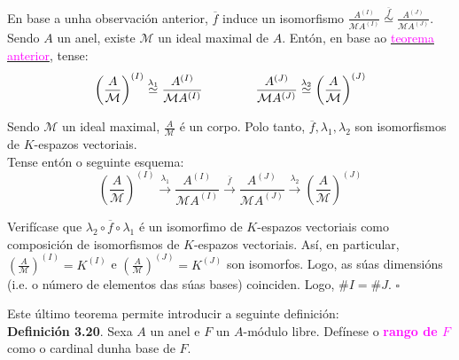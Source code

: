 \documentclass[twoside]{report}
\newcommand{\magbf}[1]{\textcolor{magenta}{\textbf{#1}}} %
\newcommand{\magen}[1]{\textcolor{magenta}{#1}}
\theoremstyle{mystyle}
\begin{document}
\vspace{2mm}

\noindent En base a unha observación anterior, $\overline{f}$ induce un isomorfismo $\displaystyle \frac{A^{(I)}}{\mathcal{M}A^{(I)}} \overset{\overline{f}}{\simeq} \displaystyle \frac{A^{(J)}}{\mathcal{M}A^{(J)}}$.\\
    
\noindent Sendo $A$ un anel, existe $\mathcal{M}$ un ideal maximal de $A$. Entón, en base ao \hyperref[th3.5]{\magen{teorema anterior}}, tense:
$$\displaystyle \left( \frac{A}{\mathcal{M}} \right)^{(I)} \overset{\lambda_{1}}{\simeq} \displaystyle \frac{A^{(I)}}{\mathcal{M}A^{(I)}} \hspace{15mm} \frac{A^{(J)}}{\mathcal{M}A^{(J)}} \overset{\lambda_{2}}{\simeq} \displaystyle \left( \frac{A}{\mathcal{M}} \right)^{(J)}$$

\noindent Sendo $\mathcal{M}$ un ideal maximal, $\displaystyle \frac{A}{\mathcal{M}}$ é un corpo. Polo tanto, $\overline{f}, \lambda_{1}, \lambda_{2}$ son isomorfismos de $K$-espazos vectoriais. \\

\noindent Tense entón o seguinte esquema:
$$\displaystyle \left( \frac{A}{\mathcal{M}} \right)^{(I)} \overset{\lambda_{1}}{\longrightarrow} \displaystyle \frac{A^{(I)}}{\mathcal{M}A^{(I)}} \overset{\overline{f}}{\longrightarrow} \frac{A^{(J)}}{\mathcal{M}A^{(J)}} \overset{\lambda_{2}}{\longrightarrow} \displaystyle \left( \frac{A}{\mathcal{M}} \right)^{(J)} $$

\noindent Verifícase que $\lambda_{2} \circ \overline{f} \circ \lambda_{1}$ é un isomorfimo de $K$-espazos vectoriais como composición de isomorfismos de $K$-espazos vectoriais. Así, en particular, $\displaystyle \left( \frac{A}{\mathcal{M}} \right)^{(I)} = K^{(I)}$ e $\displaystyle \left( \frac{A}{\mathcal{M}} \right)^{(J)} = K^{(J)}$ son isomorfos. Logo, as súas dimensións (i.e. o número de elementos das súas bases) coinciden. Logo, $\#I = \#J$. $\square$\\

\vspace{3mm}

\noindent Este último teorema permite introducir a seguinte definición:\\

\noindent \textbf{Definición 3.20}. Sexa $A$ un anel e $F$ un $A$-módulo libre. Defínese o \magbf{rango de $F$} como o cardinal dunha base de $F$.\\
\end{document}
